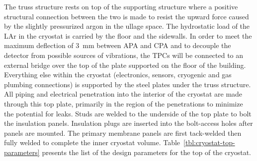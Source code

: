 The truss structure rests on top of the supporting structure where a positive structural connection 
between the two is made to resist the upward force caused by the slightly pressurized argon in the ullage 
space. The hydrostatic load of the LAr in the cryostat is carried by the floor and the sidewalls. In order to meet the maximum deflection of 3~mm between APA and CPA 
and to decouple the detector from possible sources of vibrations, the TPCs will be connected to an external bridge over the top of the plate supported on the floor of the building. Everything else within the cryostat %
(electronics, sensors, cryogenic and gas plumbing connections) is 
supported by the steel plates under the truss structure. All piping and electrical penetration into the 
interior of the cryostat are made through this top plate, primarily in the region of the penetrations to 
minimize the potential for leaks. Studs are welded to the underside of the top plate to bolt the insulation 
panels. Insulation plugs are inserted into the bolt-access holes after panels are mounted. The primary 
membrane panels are first tack-welded then fully welded to complete the inner cryostat volume.
%
Table~\ref{tbl:cryostat-top-parameters} presents the list of the design parameters for the top of the cryostat.
%
